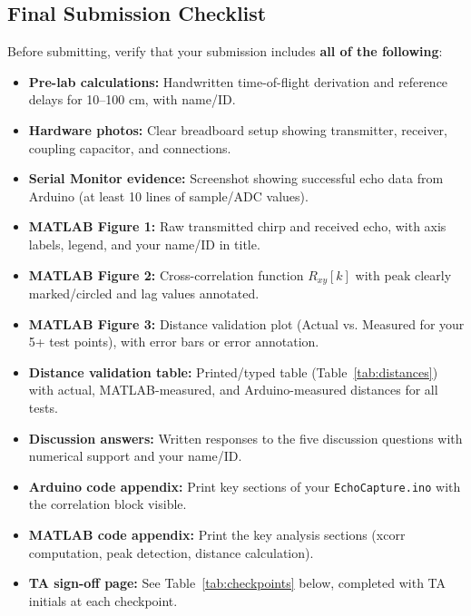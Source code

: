 \documentclass[11pt,letterpaper]{article}
\begin{document}
\subsection{Final Submission Checklist}

Before submitting, verify that your submission includes \textbf{all of the following}:

\begin{itemize}
    \item[$\square$] \textbf{Pre-lab calculations:} Handwritten time-of-flight derivation and reference delays for 10--100 cm, with name/ID.

    \item[$\square$] \textbf{Hardware photos:} Clear breadboard setup showing transmitter, receiver, coupling capacitor, and connections.

    \item[$\square$] \textbf{Serial Monitor evidence:} Screenshot showing successful echo data from Arduino (at least 10 lines of sample/ADC values).

    \item[$\square$] \textbf{MATLAB Figure 1:} Raw transmitted chirp and received echo, with axis labels, legend, and your name/ID in title.

    \item[$\square$] \textbf{MATLAB Figure 2:} Cross-correlation function $R_{xy}[k]$ with peak clearly marked/circled and lag values annotated.

    \item[$\square$] \textbf{MATLAB Figure 3:} Distance validation plot (Actual vs. Measured for your 5+ test points), with error bars or error annotation.

    \item[$\square$] \textbf{Distance validation table:} Printed/typed table (Table~\ref{tab:distances}) with actual, MATLAB-measured, and Arduino-measured distances for all tests.

    \item[$\square$] \textbf{Discussion answers:} Written responses to the five discussion questions with numerical support and your name/ID.

    \item[$\square$] \textbf{Arduino code appendix:} Print key sections of your \texttt{EchoCapture.ino} with the correlation block visible.

    \item[$\square$] \textbf{MATLAB code appendix:} Print the key analysis sections (xcorr computation, peak detection, distance calculation).

    \item[$\square$] \textbf{TA sign-off page:} See Table~\ref{tab:checkpoints} below, completed with TA initials at each checkpoint.
\end{itemize}
\end{document}
